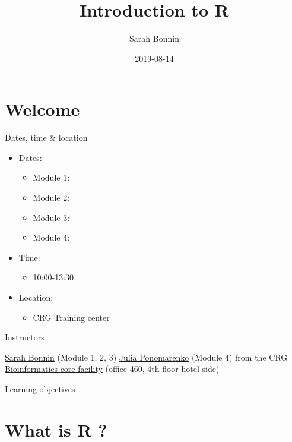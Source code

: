 \documentclass[]{book}
\title{Introduction to R}
\author{Sarah Bonnin}
\date{2019-08-14}
\providecommand{\tightlist}{%
  \setlength{\itemsep}{0pt}\setlength{\parskip}{0pt}}
\begin{document}
\maketitle

{
\setcounter{tocdepth}{1}
\tableofcontents
}
\hypertarget{welcome}{%
\chapter{Welcome}\label{welcome}}

Dates, time \& location

\begin{itemize}
\tightlist
\item
  Dates:

  \begin{itemize}
  \tightlist
  \item
    Module 1:
  \item
    Module 2:
  \item
    Module 3:
  \item
    Module 4:
  \end{itemize}
\item
  Time:

  \begin{itemize}
  \tightlist
  \item
    10:00-13:30 
  \end{itemize}
\item
  Location:

  \begin{itemize}
  \tightlist
  \item
    CRG Training center
  \end{itemize}
\end{itemize}

Instructors

\href{mailto:sarah.bonnin@crg.eu}{Sarah Bonnin} (Module 1, 2, 3)
\href{mailto:julia.ponomarenko@crg.eu}{Julia Ponomarenko} (Module 4)
from the CRG \href{https://biocore.crg.eu/}{Bioinformatics core facility} (office 460, 4th floor hotel side)

Learning objectives

\hypertarget{what-is-r}{%
\chapter{What is R ?}\label{what-is-r}}
\end{document}
